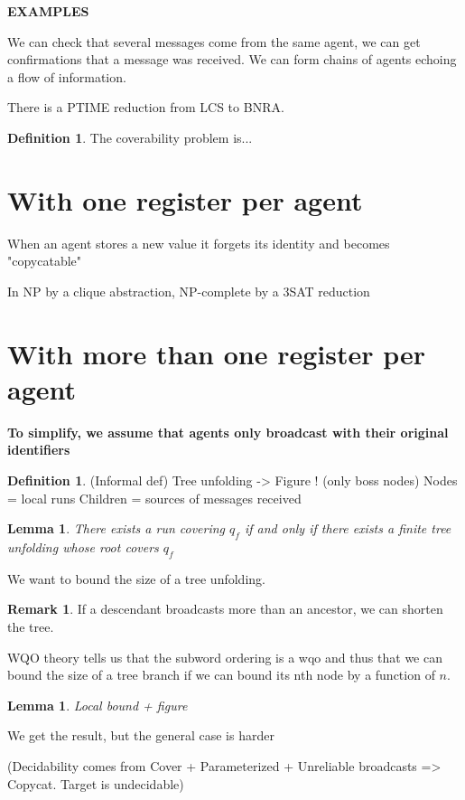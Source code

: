 \documentclass{article}
\newtheorem{lemma}[theorem]{Lemma}
\theoremstyle{definition}
\newtheorem{definition}[theorem]{Definition}
\newtheorem{remark}{Remark}
\begin{document}
	\textbf{EXAMPLES}
	
	We can check that several messages come from the same agent, we can get confirmations that a message was received.
	We can form chains of agents echoing a flow of information.
	
	\begin{theorem}
		There is a PTIME reduction from LCS to BNRA.
	\end{theorem}
	
	\begin{definition}
		The coverability problem is...
	\end{definition}
	
	\section{With one register per agent}
	
	When an agent stores a new value it forgets its identity and becomes "copycatable"
	
	In NP by a clique abstraction, NP-complete by a 3SAT reduction
	
	\section{With more than one register per agent}
	
	\textbf{To simplify, we assume that agents only broadcast with their original identifiers}
	
	\begin{definition}
		(Informal def) Tree unfolding -> Figure ! (only boss nodes)
		Nodes = local runs
		Children = sources of messages received
	\end{definition} 
	
	\begin{lemma}
		There exists a run covering $q_f$ if and only if there exists a finite tree unfolding whose root covers $q_f$
	\end{lemma}
	
	We want to bound the size of a tree unfolding.
	
	\begin{remark}
		If a descendant broadcasts more than an ancestor, we can shorten the tree.
	\end{remark}
	
	WQO theory tells us that the subword ordering is a wqo and thus that we can bound the size of a tree branch if we can bound its nth node by a function of $n$.
	
	\begin{lemma}
		Local bound + figure
	\end{lemma}
	
	We get the result, but the general case is harder
	
	(Decidability comes from Cover + Parameterized +  Unreliable broadcasts => Copycat. Target is undecidable)
	
\end{document}
